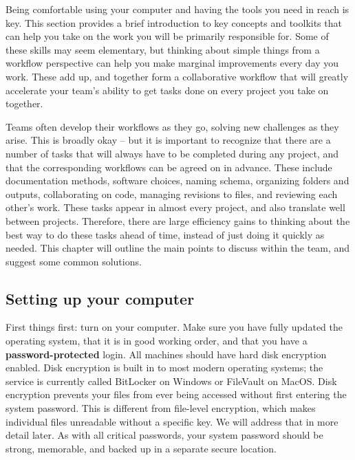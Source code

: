 Being comfortable using your computer and having the tools you need in reach is key.
This section provides a brief introduction to key concepts and toolkits
that can help you take on the work you will be primarily responsible for.
Some of these skills may seem elementary,
but thinking about simple things from a workflow perspective
can help you make marginal improvements every day you work.
These add up, and together form a collaborative workflow
that will greatly accelerate your team's ability to get tasks done
on every project you take on together.

Teams often develop their workflows as they go,
solving new challenges as they arise.
This is broadly okay -- but it is important to recognize
that there are a number of tasks that will always have to be completed during any project,
and that the corresponding workflows can be agreed on in advance.
These include documentation methods, software choices,
naming schema, organizing folders and outputs, collaborating on code,
managing revisions to files, and reviewing each other's work.
These tasks appear in almost every project,
and also translate well between projects.
Therefore, there are large efficiency gains to
thinking about the best way to do these tasks ahead of time,
instead of just doing it quickly as needed.
This chapter will outline the main points to discuss within the team,
and suggest some common solutions.

\subsection{Setting up your computer}

First things first: turn on your computer.
Make sure you have fully updated the operating system,
that it is in good working order,
and that you have a \textbf{password-protected} login.
All machines should have hard disk encryption enabled.
Disk encryption is built in to most modern operating systems;
the service is currently called BitLocker on Windows or FileVault on MacOS.
Disk encryption prevents your files from ever being accessed
without first entering the system password.
This is different from file-level encryption,
which makes individual files unreadable without a specific key.
We will address that in more detail later.
As with all critical passwords, your system password should be strong,
memorable, and backed up in a separate secure location.

